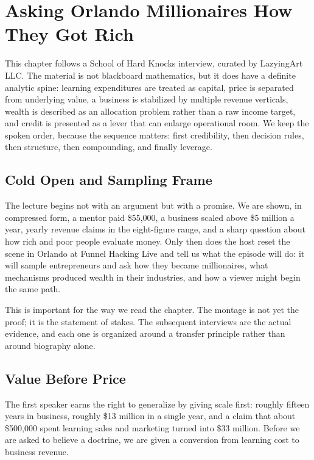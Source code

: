 \chapter{Asking Orlando Millionaires How They Got Rich}

This chapter follows a School of Hard Knocks interview, curated by LazyingArt LLC. The material is not blackboard mathematics, but it does have a definite analytic spine: learning expenditures are treated as capital, price is separated from underlying value, a business is stabilized by multiple revenue verticals, wealth is described as an allocation problem rather than a raw income target, and credit is presented as a lever that can enlarge operational room. We keep the spoken order, because the sequence matters: first credibility, then decision rules, then structure, then compounding, and finally leverage.

\section{Cold Open and Sampling Frame}

The lecture begins not with an argument but with a promise. We are shown, in compressed form, a mentor paid \$55{,}000, a business scaled above \$5 million a year, yearly revenue claims in the eight-figure range, and a sharp question about how rich and poor people evaluate money. Only then does the host reset the scene in Orlando at Funnel Hacking Live and tell us what the episode will do: it will sample entrepreneurs and ask how they became millionaires, what mechanisms produced wealth in their industries, and how a viewer might begin the same path.

This is important for the way we read the chapter. The montage is not yet the proof; it is the statement of stakes. The subsequent interviews are the actual evidence, and each one is organized around a transfer principle rather than around biography alone.

\section{Value Before Price}

The first speaker earns the right to generalize by giving scale first: roughly fifteen years in business, roughly \$13 million in a single year, and a claim that about \$500{,}000 spent learning sales and marketing turned into \$33 million. Before we are asked to believe a doctrine, we are given a conversion from learning cost to business revenue.

